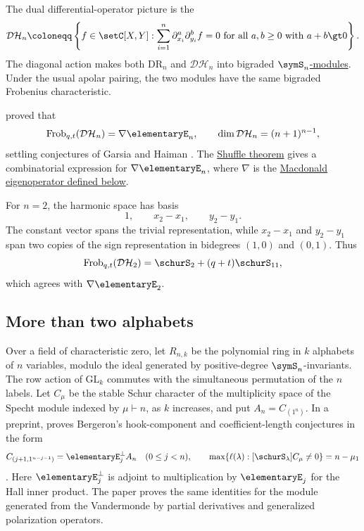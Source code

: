 The dual differential-operator picture is the \label{diagonalHarmonicsSpace}
\[
\mathcal{DH}_n
\coloneqq
\left\{
 f\in\setC[X,Y]:
 \sum_{i=1}^{n}
 \partial_{x_i}^{a}\partial_{y_i}^{b}f=0
 \text{ for all } a,b\geq0 \text{ with } a+b\gt0
\right\}.
\]
The diagonal action makes both \(\mathrm{DR}_n\) and \(\mathcal{DH}_n\) into
bigraded \hyperref[SnRepresentationTheory]{$\symS_n$-modules}.  Under the
usual apolar pairing, the two modules have the same bigraded Frobenius
characteristic.

 proved that
\[
 \mathrm{Frob}_{q,t}(\mathcal{DH}_n)=\nabla \elementaryE_n,
 \qquad
 \dim \mathcal{DH}_n=(n+1)^{n-1},
\]
settling conjectures of Garsia and Haiman
\cite{Haiman1994,Haiman2002}.  The
\hyperref[dhShuffleTheorem]{Shuffle theorem} gives a combinatorial expression
for \(\nabla\elementaryE_n\), where \(\nabla\) is the
\hyperref[nablaOperator]{Macdonald eigenoperator defined below}.

\begin{example*}[The case \(n=2\)]
For \(n=2\), the harmonic space has basis
\[
 1,\qquad x_2-x_1,\qquad y_2-y_1.
\]
The constant vector spans the trivial representation, while
\(x_2-x_1\) and \(y_2-y_1\) span two copies of the sign representation in
bidegrees \((1,0)\) and \((0,1)\).  Thus
\[
  \mathrm{Frob}_{q,t}(\mathcal{DH}_2)
  = \schurS_2 + (q+t)\schurS_{11},
\]
which agrees with \(\nabla\elementaryE_2\).
\end{example*}


\subsection[dhManyAlphabets]{More than two alphabets}

Over a field of characteristic zero, let $R_{n,k}$ be the polynomial ring
in $k$ alphabets of $n$ variables, modulo the ideal generated by positive-degree
$\symS_n$-invariants. The row action of $\mathrm{GL}_k$ commutes with
the simultaneous permutation of the $n$ labels. Let $C_\mu$ be the stable
Schur character of the multiplicity space of the Specht module indexed by
$\mu\vdash n$, as $k$ increases, and put $A_n=C_{(1^n)}$.
In a preprint,  proves Bergeron's hook-component and
coefficient-length conjectures in the form
\[
 C_{(j+1,1^{n-j-1})}=\elementaryE_j^\perp A_n
 \quad(0\leq j<n),
 \qquad
 \max\{\ell(\lambda):[\schurS_\lambda]C_\mu\ne0\}=n-\mu_1
\]
\cite[Thm.~A]{Ercan2026x}. Here $\elementaryE_j^\perp$ is adjoint to
multiplication by $\elementaryE_j$ for the Hall inner product.
The paper proves the same identities for the module generated from the
Vandermonde by partial derivatives and generalized polarization operators.


